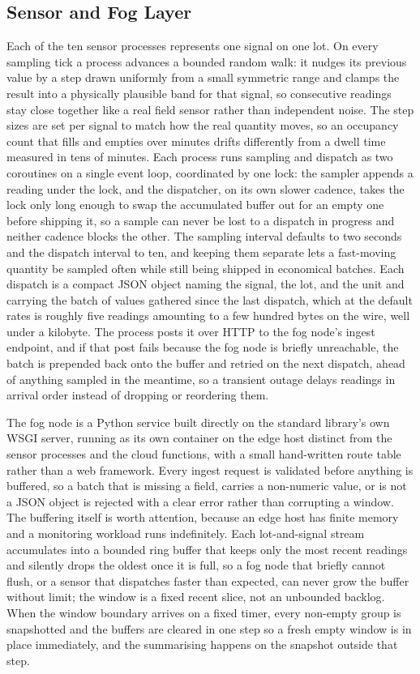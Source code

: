 \documentclass[conference]{IEEEtran}
\begin{document}
\subsection{Sensor and Fog Layer}

Each of the ten sensor processes represents one signal on one lot. On every sampling tick a process advances a bounded random walk: it nudges its previous value by a step drawn uniformly from a small symmetric range and clamps the result into a physically plausible band for that signal, so consecutive readings stay close together like a real field sensor rather than independent noise. The step sizes are set per signal to match how the real quantity moves, so an occupancy count that fills and empties over minutes drifts differently from a dwell time measured in tens of minutes. Each process runs sampling and dispatch as two coroutines on a single event loop, coordinated by one lock: the sampler appends a reading under the lock, and the dispatcher, on its own slower cadence, takes the lock only long enough to swap the accumulated buffer out for an empty one before shipping it, so a sample can never be lost to a dispatch in progress and neither cadence blocks the other. The sampling interval defaults to two seconds and the dispatch interval to ten, and keeping them separate lets a fast-moving quantity be sampled often while still being shipped in economical batches. Each dispatch is a compact JSON object naming the signal, the lot, and the unit and carrying the batch of values gathered since the last dispatch, which at the default rates is roughly five readings amounting to a few hundred bytes on the wire, well under a kilobyte. The process posts it over HTTP to the fog node's ingest endpoint, and if that post fails because the fog node is briefly unreachable, the batch is prepended back onto the buffer and retried on the next dispatch, ahead of anything sampled in the meantime, so a transient outage delays readings in arrival order instead of dropping or reordering them.

The fog node is a Python service built directly on the standard library's own WSGI server, running as its own container on the edge host distinct from the sensor processes and the cloud functions, with a small hand-written route table rather than a web framework. Every ingest request is validated before anything is buffered, so a batch that is missing a field, carries a non-numeric value, or is not a JSON object is rejected with a clear error rather than corrupting a window. The buffering itself is worth attention, because an edge host has finite memory and a monitoring workload runs indefinitely. Each lot-and-signal stream accumulates into a bounded ring buffer that keeps only the most recent readings and silently drops the oldest once it is full, so a fog node that briefly cannot flush, or a sensor that dispatches faster than expected, can never grow the buffer without limit; the window is a fixed recent slice, not an unbounded backlog. When the window boundary arrives on a fixed timer, every non-empty group is snapshotted and the buffers are cleared in one step so a fresh empty window is in place immediately, and the summarising happens on the snapshot outside that step.
\end{document}
